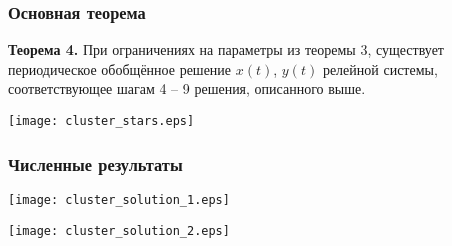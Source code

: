 \begin{frame}
	\frametitle{Основная теорема}
	\textbf{Теорема 4.} При ограничениях на параметры из теоремы 3, существует периодическое обобщённое решение $x(t)$, $y(t)$ релейной системы, соответствующее шагам 4 -- 9 решения, описанного выше.
	
	\begin{center}
		\texttt{[image: cluster\_stars.eps]}
	\end{center}
\end{frame}

\begin{frame}
	\frametitle{Численные результаты}
	\texttt{[image: cluster\_solution\_1.eps]}
	
	\texttt{[image: cluster\_solution\_2.eps]}
\end{frame}
